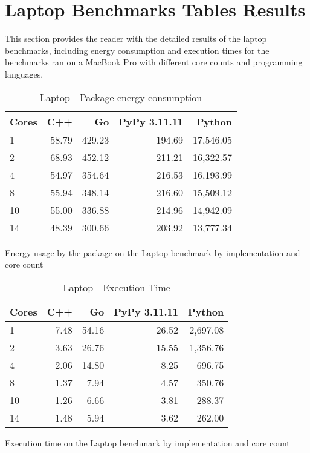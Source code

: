 \chapter{Laptop Benchmarks Tables Results}

This section provides the reader with the detailed results of the laptop benchmarks, including energy consumption and execution times for the benchmarks ran on a MacBook Pro with different core counts and programming languages.

\begin{table}[H]
    \centering
    \begin{tabular}{lrrrr}
        \hline
        Cores & C++   & Go       & PyPy 3.11.11 & Python      \\
        \hline
        1     & 58.79  & 429.23  & 194.69       & 17,546.05   \\
        2     & 68.93  & 452.12  & 211.21       & 16,322.57   \\
        4     & 54.97  & 354.64  & 216.53       & 16,193.99   \\
        8     & 55.94  & 348.14  & 216.60       & 15,509.12   \\
        10    & 55.00  & 336.88  & 214.96       & 14,942.09   \\
        14    & 48.39  & 300.66  & 203.92       & 13,777.34   \\
        \hline
    \end{tabular}
\caption{Laptop - Package energy consumption}{Energy usage by the package on the Laptop benchmark by implementation and core count}
\label{tab:mbp-power-consumption}
\end{table}

\begin{table}[H]
    \centering
    \begin{tabular}{lrrrr}
        \hline
        Cores & C++  & Go    & PyPy 3.11.11 & Python    \\
        \hline
        1     & 7.48  & 54.16  & 26.52        & 2,697.08  \\
        2     & 3.63  & 26.76  & 15.55        & 1,356.76  \\
        4     & 2.06  & 14.80  & 8.25         & 696.75    \\
        8     & 1.37  & 7.94   & 4.57         & 350.76    \\
        10    & 1.26  & 6.66   & 3.81         & 288.37    \\
        14    & 1.48  & 5.94   & 3.62         & 262.00    \\
        \hline
    \end{tabular}
\caption{Laptop - Execution Time}{Execution time on the Laptop benchmark by implementation and core count}
\label{tab:mbp-time-execution}
\end{table}


